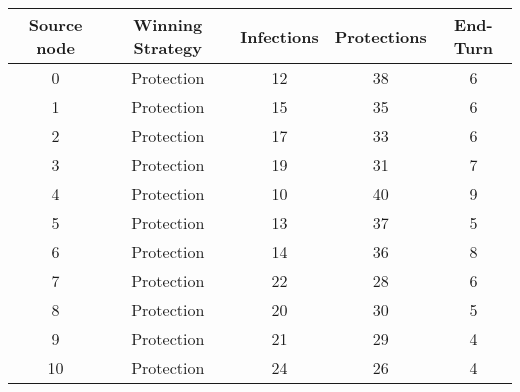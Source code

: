 \documentclass[results.tex]{subfiles}
\begin{document}
    \begin{center}
        \begin{tabular}{| c || c | c | c | c |}
            \hline
            {\bfseries Source node} & {\bfseries Winning Strategy} & {\bfseries Infections} & {\bfseries Protections}
            & {\bfseries End-Turn}
            \\  %
            \hline\hline
            0                       & Protection                   & 12                     & 38                      & 6                    \\
            \hline
            1                       & Protection                   & 15                     & 35                      & 6                    \\
            \hline
            2                       & Protection                   & 17                     & 33                      & 6                    \\
            \hline
            3                       & Protection                   & 19                     & 31                      & 7                    \\
            \hline
            4                       & Protection                   & 10                     & 40                      & 9                    \\
            \hline
            5                       & Protection                   & 13                     & 37                      & 5                    \\
            \hline
            6                       & Protection                   & 14                     & 36                      & 8                    \\
            \hline
            7                       & Protection                   & 22                     & 28                      & 6                    \\
            \hline
            8                       & Protection                   & 20                     & 30                      & 5                    \\
            \hline
            9                       & Protection                   & 21                     & 29                      & 4                    \\
            \hline
            10                      & Protection                   & 24                     & 26                      & 4                    \\

\end{tabular}
\end{center}
\end{document}
